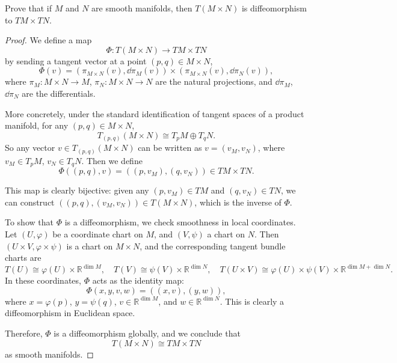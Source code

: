 \begin{problem}
    Prove that if $M$ and $N$ are smooth manifolds, then $T(M \times N)$ is diffeomorphism to $TM \times TN$.
    \begin{proof}
    We define a map
    \[
        \Phi \colon T(M \times N) \to TM \times TN
    \]
    by sending a tangent vector at a point \((p, q) \in M \times N\),
    \[
        \Phi(v) = \left( \pi_{M \times N}(v), \dd{\pi}_M(v) \right) \times \left( \pi_{M \times N}(v), \dd{\pi}_N(v) \right),
    \]
    where \( \pi_M: M \times N \to M \), \( \pi_N: M \times N \to N \) are the natural projections, and \( \dd{\pi}_M \), \( \dd{\pi}_N \) are the differentials.

    More concretely, under the standard identification of tangent spaces of a product manifold, for any \( (p, q) \in M \times N \),
    \[
        T_{(p,q)}(M \times N) \cong T_pM \oplus T_qN.
    \]
    So any vector \( v \in T_{(p,q)}(M \times N) \) can be written as \( v = (v_M, v_N) \), where \( v_M \in T_pM \), \( v_N \in T_qN \). Then we define
    \[
        \Phi((p,q), v) = ((p, v_M), (q, v_N)) \in TM \times TN.
    \]

    This map is clearly bijective: given any \( (p, v_M) \in TM \) and \( (q, v_N) \in TN \), we can construct \( ((p, q), (v_M, v_N)) \in T(M \times N) \), which is the inverse of \( \Phi \).

    To show that \( \Phi \) is a diffeomorphism, we check smoothness in local coordinates. Let \( (U, \varphi) \) be a coordinate chart on \( M \), and \( (V, \psi) \) a chart on \( N \). Then \( (U \times V, \varphi \times \psi) \) is a chart on \( M \times N \), and the corresponding tangent bundle charts are
    \[
        T(U) \cong \varphi(U) \times \mathbb{R}^{\dim M}, \quad T(V) \cong \psi(V) \times \mathbb{R}^{\dim N}, \quad T(U \times V) \cong \varphi(U) \times \psi(V) \times \mathbb{R}^{\dim M + \dim N}.
    \]
    In these coordinates, \( \Phi \) acts as the identity map:
    \[
        \Phi(x, y, v, w) = ((x, v), (y, w)),
    \]
    where \( x = \varphi(p) \), \( y = \psi(q) \), \( v \in \mathbb{R}^{\dim M} \), and \( w \in \mathbb{R}^{\dim N} \). This is clearly a diffeomorphism in Euclidean space.

    Therefore, \( \Phi \) is a diffeomorphism globally, and we conclude that
    \[
        T(M \times N) \cong TM \times TN
    \]
    as smooth manifolds.
\end{proof}
\end{problem}

